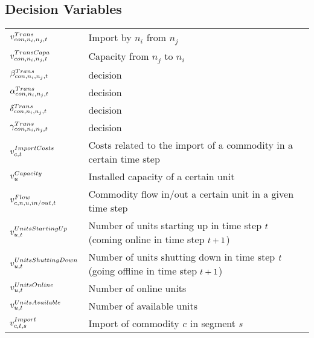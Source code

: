 \subsection*{Decision Variables}
\vspace{-1em}
	\begin{longtable}{p{\cola} p{\colc} >{\small\raggedleft\arraybackslash\itshape}p{\colb}}
		$v^{Trans}_{{con},n_i,n_j,t}        $	& Import by $n_i$ from $n_j$                                  	&                \\
		$v^{TransCapa}_{{con},n_i,n_j,t}     $	& Capacity from $n_j$ to $n_i$                                	&                \\
		$\beta^{Trans}_{{con},n_i,n_j,t}            $	& decision                                                    	&                \\
		$\alpha^{Trans}_{{con},n_i,n_j,t}            $	& decision                                                    	&                \\
		$\delta^{Trans}_{{con},n_i,n_j,t}            $	& decision                                                    	&                \\
		$\gamma^{Trans}_{{con},n_i,n_j,t}            $	& decision                                                    	&                \\[0.5em]

		$v^{ImportCosts}_{c,t}  $	& Costs related to the import of a commodity in a certain time step	&                \\[0.5em]

		$v^{Capacity}_{u}     $	& Installed capacity of a certain unit                        	&                \\[0.5em]

		$v^{Flow}_{c,n, u,in/out,t}         $	& Commodity flow in/out a certain unit in a given time step   	&                \\
		$v^{UnitsStartingUp}_{u,t}$	& Number of units starting up in time step $t$ (coming online in time step $t +1$)	&                \\
		$v^{UnitsShuttingDown}_{u,t}$	& Number of units shutting down in time step $t$ (going offline in time step $t +1$)	&                \\
		$v^{UnitsOnline}_{u,t}  $	& Number of online units                                      	&                \\
		$v^{UnitsAvailable}_{u,t}$	& Number of available units                                   	&                \\
		$v^{Import}_{c,t,s}       $	& Import of commodity $c$ in segment $s$      	&                \\
	\end{longtable}

